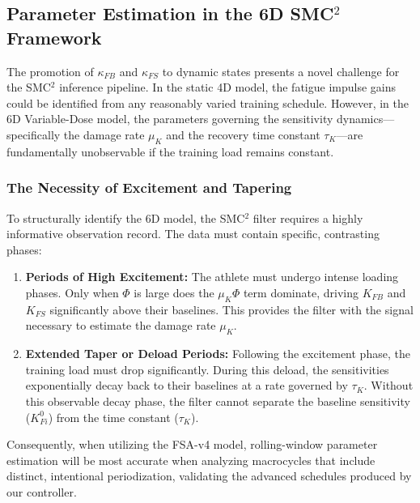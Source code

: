 \subsection{Parameter Estimation in the 6D SMC$^2$ Framework}

The promotion of $\kappa_{FB}$ and $\kappa_{FS}$ to dynamic states presents a novel challenge for the SMC$^2$ inference pipeline. In the static 4D model, the fatigue impulse gains could be identified from any reasonably varied training schedule. However, in the 6D Variable-Dose model, the parameters governing the sensitivity dynamics—specifically the damage rate $\mu_K$ and the recovery time constant $\tau_K$—are fundamentally unobservable if the training load remains constant.

\subsubsection{The Necessity of Excitement and Tapering}

To structurally identify the 6D model, the SMC$^2$ filter requires a highly informative observation record. The data must contain specific, contrasting phases:
\begin{enumerate}
    \item \textbf{Periods of High Excitement:} The athlete must undergo intense loading phases. Only when $\Phi$ is large does the $\mu_K \Phi$ term dominate, driving $K_{FB}$ and $K_{FS}$ significantly above their baselines. This provides the filter with the signal necessary to estimate the damage rate $\mu_K$.
    \item \textbf{Extended Taper or Deload Periods:} Following the excitement phase, the training load must drop significantly. During this deload, the sensitivities exponentially decay back to their baselines at a rate governed by $\tau_K$. Without this observable decay phase, the filter cannot separate the baseline sensitivity ($K_{Fi}^0$) from the time constant ($\tau_K$).
\end{enumerate}

Consequently, when utilizing the FSA-v4 model, rolling-window parameter estimation will be most accurate when analyzing macrocycles that include distinct, intentional periodization, validating the advanced schedules produced by our controller.
